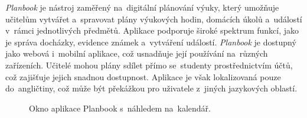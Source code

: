 \documentclass[male,czech,api_bc]{kitheses}
\begin{document}
\textit{Planbook} je nástroj zaměřený na~digitální plánování výuky, který umožňuje učitelům vytvářet a~spravovat plány výukových hodin, domácích úkolů a~událostí v~rámci jednotlivých předmětů. Aplikace podporuje široké spektrum funkcí, jako je správa docházky, evidence známek a~vytváření událostí. \textit{Planbook} je dostupný jako webová i~mobilní aplikace, což usnadňuje její používání na~různých zařízeních. Učitelé mohou plány sdílet přímo se~studenty prostřednictvím účtů, což zajišťuje jejich snadnou dostupnost. Aplikace je však lokalizovaná pouze do~angličtiny, což může být překážkou pro uživatele z~jiných jazykových oblastí.

\begin{figure}[H]
	\centering
	\caption{Okno aplikace Planbook s~náhledem na~kalendář.}
	\label{fig:planbook-1}
\end{figure}
\end{document}
